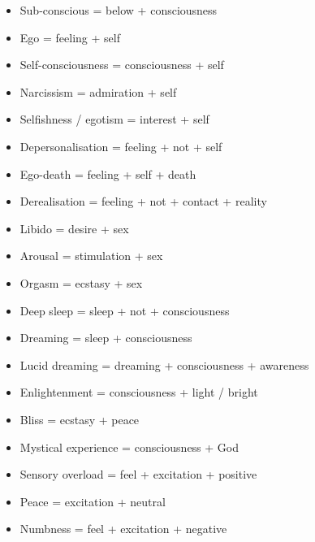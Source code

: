 \documentclass[a5,landscape]{article}
\begin{document}
{\begin{multicols}{4}
\begin{itemize}
\item   Sub-conscious = below + consciousness 

\item   Ego = feeling + self 

\item   Self-consciousness = consciousness + self 

\item   Narcissism = admiration + self 

\item   Selfishness / egotism = interest + self 

\item   Depersonalisation = feeling + not + self 

\item   Ego-death = feeling + self + death 

\item   Derealisation = feeling + not + contact + reality  

\item   Libido = desire + sex 

\item   Arousal = stimulation + sex 

\item   Orgasm = ecstasy + sex 

\item   Deep sleep = sleep + not + consciousness 

\item   Dreaming = sleep + consciousness 

\item   Lucid dreaming = dreaming + consciousness + awareness 

\item   Enlightenment = consciousness + light / bright 

\item   Bliss = ecstasy + peace 

\item   Mystical experience = consciousness + God 

\item   Sensory overload = feel + excitation + positive 

\item   Peace = excitation + neutral 

\item   Numbness = feel + excitation + negative 


\end{itemize}
\end{multicols}}
\end{document}
